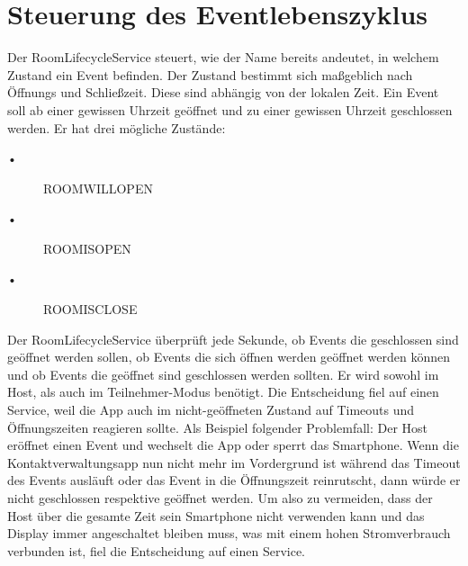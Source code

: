 \section{Steuerung des Eventlebenszyklus}
\label{sec:RoomLifecycleService}
Der RoomLifecycleService steuert, wie der Name bereits andeutet, in welchem Zustand ein Event befinden.
 Der Zustand bestimmt sich maßgeblich nach Öffnungs und Schließzeit.
Diese sind abhängig von der lokalen Zeit. Ein Event soll ab einer gewissen Uhrzeit geöffnet und zu einer gewissen Uhrzeit geschlossen werden. 
Er hat drei mögliche Zustände:
\begin{description}
\item[•] ROOMWILLOPEN
\item[•] ROOMISOPEN
\item[•] ROOMISCLOSE
\end{description}

Der RoomLifecycleService überprüft jede Sekunde, ob Events die geschlossen sind geöffnet werden sollen, ob Events die sich öffnen werden geöffnet werden können und ob Events die geöffnet sind geschlossen werden sollten. 
Er wird sowohl im Host, als auch im Teilnehmer-Modus benötigt. 
Die Entscheidung fiel auf einen Service, weil die App auch im nicht-geöffneten Zustand auf Timeouts und Öffnungszeiten reagieren sollte.
Als Beispiel folgender Problemfall: Der Host eröffnet einen Event und wechselt die App oder sperrt das Smartphone. 
Wenn die Kontaktverwaltungsapp nun nicht mehr im Vordergrund ist während das Timeout des Events ausläuft oder das Event in die Öffnungszeit reinrutscht, dann würde er nicht geschlossen respektive geöffnet werden. 
Um also zu vermeiden, dass der Host über die gesamte Zeit sein Smartphone nicht verwenden kann und das Display immer angeschaltet bleiben muss, was mit einem hohen Stromverbrauch verbunden ist, fiel die Entscheidung auf einen Service.

